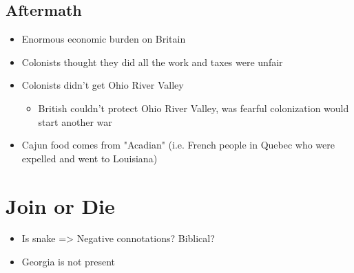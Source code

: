 \documentclass[letterpaper]{article}
\begin{document}
\subsection{Aftermath}
\label{sec:org703f9e5}
\begin{itemize}
\item Enormous economic burden on Britain
\item Colonists thought they did all the work and taxes were unfair
\item Colonists didn't get Ohio River Valley
\begin{itemize}
\item British couldn't protect Ohio River Valley, was fearful colonization would start another war
\end{itemize}
\item Cajun food comes from "Acadian" (i.e. French people in Quebec who were expelled and went to Louisiana)
\end{itemize}
\section{Join or Die}
\label{sec:org3e93d7d}
\begin{itemize}
\item Is snake => Negative connotations? Biblical?
\item Georgia is not present
\end{itemize}
\end{document}
